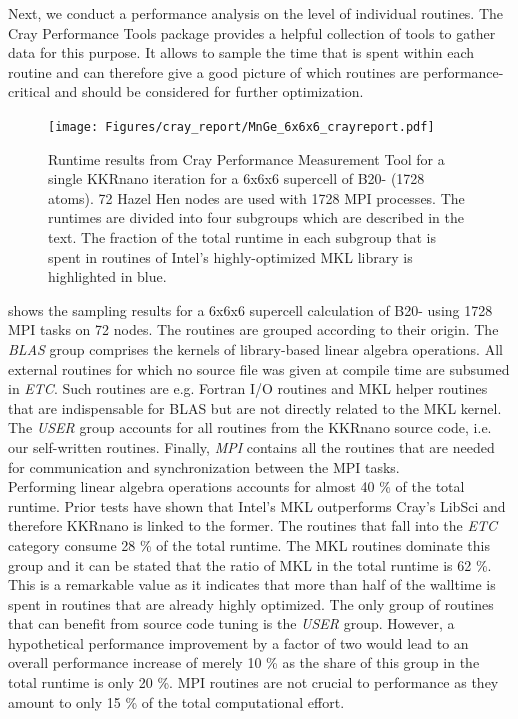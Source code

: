 \documentclass [a4paper, 12pt]{article}
\begin{document}
Next, we conduct a performance analysis on the level of individual routines.
The Cray Performance Tools package provides a helpful collection of tools to gather data for this purpose.
It allows to sample the time that is spent within each routine and can therefore give a good
picture of which routines are performance-critical and should be considered for further optimization.
\\
\begin{figure}[h]
\begin{center}
 \texttt{[image: Figures/cray\_report/MnGe\_6x6x6\_crayreport.pdf]}
\end{center}
	\caption{Runtime results from Cray Performance Measurement Tool for a single KKRnano iteration 
	for a 6x6x6 supercell of B20- (1728 atoms). 72 Hazel Hen nodes are used with 1728 MPI processes.
	The runtimes are divided into four subgroups which are described in the text.
	The fraction of the total runtime in each subgroup that is spent in
	routines of Intel's highly-optimized MKL library is highlighted in blue.
	}
\label{fig:MnGe_6x6x6_crayreport}
\end{figure}
 shows the sampling results for a 6x6x6 supercell calculation
of B20- using 1728 MPI tasks on 72 nodes.
The routines are grouped according to their origin. The \textit{BLAS} group comprises the kernels of
library-based linear algebra operations. 
All external routines for which no source file was given at compile time are subsumed
in \textit{ETC}. Such routines are e.g. Fortran I/O routines and MKL helper routines
that are indispensable for BLAS but are not directly related
to the MKL kernel.
The \textit{USER} group accounts for all routines from the KKRnano source code, i.e. our self-written routines.
Finally, \textit{MPI} contains all the routines that are needed for communication and synchronization
between the MPI tasks. 
\\
Performing linear algebra operations accounts for almost 40 \% of the total runtime. Prior tests have shown that
Intel's MKL outperforms Cray's LibSci and therefore KKRnano is linked to the former.
The routines that fall into the \textit{ETC} category consume 28 \% of the total runtime. 
The MKL routines dominate this group and it can be stated that the ratio of MKL in the total runtime is 62 \%.
This is a remarkable value as it indicates that more than half of the walltime is spent in routines
that are already highly optimized.
The only group of routines that can benefit from source code tuning is the \textit{USER} group.
However, a hypothetical performance improvement by a factor of two would lead to
an overall performance increase of merely 10 \% as the share of this group in the total runtime is only 20 \%.
MPI routines are not crucial to performance as they amount to only 15 \% of the total
computational effort.
\end{document}
